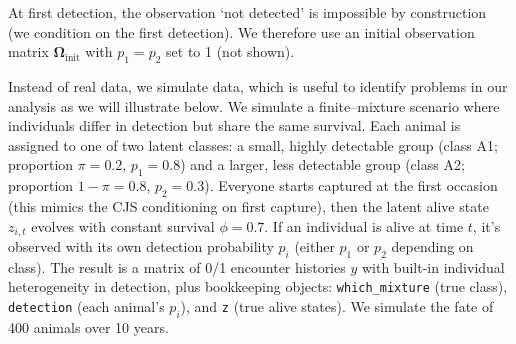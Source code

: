 \documentclass[
  12pt,
]{krantz}
\begin{document}
At first detection, the observation `not detected' is impossible by construction (we condition on the first detection). We therefore use an initial observation matrix \(\mathbf{\Omega}_{\text{init}}\) with \(p_1 = p_2\) set to 1 (not shown).

Instead of real data, we simulate data, which is useful to identify problems in our analysis as we will illustrate below. We simulate a finite--mixture scenario where individuals differ in detection but share the same survival. Each animal is assigned to one of two latent classes: a small, highly detectable group (class A1; proportion \(\pi = 0.2\), \(p_1=0.8\)) and a larger, less detectable group (class A2; proportion \(1-\pi = 0.8\), \(p_2=0.3\)). Everyone starts captured at the first occasion (this mimics the CJS conditioning on first capture), then the latent alive state \(z_{i,t}\) evolves with constant survival \(\phi = 0.7\). If an individual is alive at time \(t\), it's observed with its own detection probability \(p_i\) (either \(p_1\) or \(p_2\) depending on class). The result is a matrix of 0/1 encounter histories \(y\) with built-in individual heterogeneity in detection, plus bookkeeping objects: \texttt{which\_mixture} (true class), \texttt{detection} (each animal's \(p_i\)), and \texttt{z} (true alive states). We simulate the fate of 400 animals over 10 years.
\end{document}
